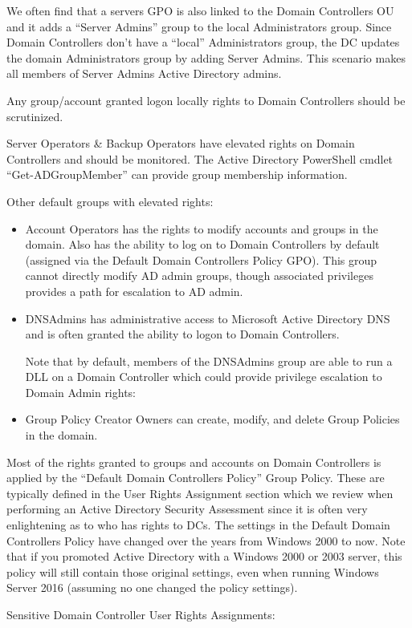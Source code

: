 We often find that a servers GPO is also linked to the Domain Controllers OU and it adds a “Server Admins” group to the local Administrators group. Since Domain Controllers don’t have a “local” Administrators group, the DC updates the domain Administrators group by adding Server Admins. This scenario makes all members of Server Admins Active Directory admins.

Any group/account granted logon locally rights to Domain Controllers should be scrutinized.

Server Operators \& Backup Operators have elevated rights on Domain Controllers and should be monitored. The Active Directory PowerShell cmdlet “Get-ADGroupMember” can provide group membership information.

 Other default groups with elevated rights:

\begin{itemize}
    \item Account Operators has the rights to modify accounts and groups in the domain. Also has the ability to log on to Domain Controllers by default (assigned via the Default Domain Controllers Policy GPO). This group cannot directly modify AD admin groups, though associated privileges provides a path for escalation to AD admin.
    \item DNSAdmins has administrative access to Microsoft Active Directory DNS and is often granted the ability to logon to Domain Controllers.

Note that by default, members of the DNSAdmins group are able to run a DLL on a Domain Controller which could provide privilege escalation to Domain Admin rights: 
    \item Group Policy Creator Owners can create, modify, and delete Group Policies in the domain.
\end{itemize}
Most of the rights granted to groups and accounts on Domain Controllers is applied by the “Default Domain Controllers Policy” Group Policy. These are typically defined in the User Rights Assignment section which we review when performing an Active Directory Security Assessment since it is often very enlightening as to who has rights to DCs. The settings in the Default Domain Controllers Policy have changed over the years from Windows 2000 to now. Note that if you promoted Active Directory with a Windows 2000 or 2003 server, this policy will still contain those original settings, even when running Windows Server 2016 (assuming no one changed the policy settings).

 Sensitive Domain Controller User Rights Assignments:

